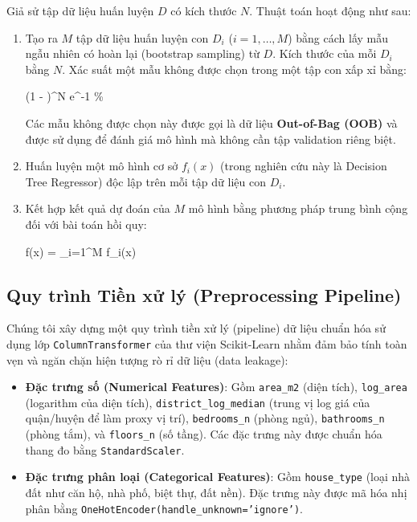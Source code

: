 \documentclass[sigconf]{acmart}
\begin{document}
Giả sử tập dữ liệu huấn luyện $D$ có kích thước $N$. Thuật toán hoạt động như sau:
\begin{enumerate}
    \item Tạo ra $M$ tập dữ liệu huấn luyện con $D_i$ ($i = 1, \dots, M$) bằng cách lấy mẫu ngẫu nhiên có hoàn lại (bootstrap sampling) từ $D$. Kích thước của mỗi $D_i$ bằng $N$. Xác suất một mẫu không được chọn trong một tập con xấp xỉ bằng:
    \begin{equation{}}
        \left(1 - \right)^N \approx e^{-1} \%
    \end{equation{}}
    Các mẫu không được chọn này được gọi là dữ liệu \textbf{Out-of-Bag (OOB)} và được sử dụng để đánh giá mô hình mà không cần tập validation riêng biệt.
    \item Huấn luyện một mô hình cơ sở $f_i(x)$ (trong nghiên cứu này là Decision Tree Regressor) độc lập trên mỗi tập dữ liệu con $D_i$.
    \item Kết hợp kết quả dự đoán của $M$ mô hình bằng phương pháp trung bình cộng đối với bài toán hồi quy:
    \begin{equation{}}
        f(x) =  \sum_{i=1}^{M} f_i(x)
    \end{equation{}}
\end{enumerate}

\subsection{Quy trình Tiền xử lý (Preprocessing Pipeline)}
Chúng tôi xây dựng một quy trình tiền xử lý (pipeline) dữ liệu chuẩn hóa sử dụng lớp \texttt{ColumnTransformer} của thư viện Scikit-Learn \cite{pedregosa2011scikit} nhằm đảm bảo tính toàn vẹn và ngăn chặn hiện tượng rò rỉ dữ liệu (data leakage):
\begin{itemize}
    \item \textbf{Đặc trưng số (Numerical Features)}: Gồm \texttt{area\_m2} (diện tích), \texttt{log\_area} (logarithm của diện tích), \texttt{district\_log\_median} (trung vị log giá của quận/huyện để làm proxy vị trí), \texttt{bedrooms\_n} (phòng ngủ), \texttt{bathrooms\_n} (phòng tắm), và \texttt{floors\_n} (số tầng). Các đặc trưng này được chuẩn hóa thang đo bằng \texttt{StandardScaler}.
    \item \textbf{Đặc trưng phân loại (Categorical Features)}: Gồm \texttt{house\_type} (loại nhà đất như căn hộ, nhà phố, biệt thự, đất nền). Đặc trưng này được mã hóa nhị phân bằng \texttt{OneHotEncoder(handle\_unknown='ignore')}.
\end{itemize}
\end{document}
